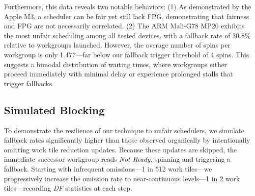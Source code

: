 \documentclass[acmsmall, manuscript, screen, review, anonymous]{acmart}
\begin{document}
Furthermore, this data reveals two notable behaviors: (1) As demonstrated by the Apple M3, a scheduler can be fair yet still lack FPG, demonstrating that fairness and FPG are not necessarily correlated. (2) The ARM Mali-G78 MP20 exhibits the most unfair scheduling among all tested devices, with a fallback rate of 30.8\% relative to workgroups launched. However, the average number of spins per workgroup is only 1.477---far below our fallback trigger threshold of 4 spins. This suggests a bimodal distribution of waiting times, where workgroups either proceed immediately with minimal delay or experience prolonged stalls that trigger fallbacks.

\subsection{Simulated Blocking}%
\label{sec:Sim-Blocking}
To demonstrate the resilience of our technique to unfair schedulers, we simulate fallback rates significantly higher than those observed organically by intentionally omitting work tile reduction updates. Because these updates are skipped, the immediate successor workgroup reads \emph{Not Ready}, spinning and triggering a fallback. Starting with infrequent omissions---1 in 512 work tiles---we progressively increase the omission rate to near-continuous levels---1 in 2 work tiles---recording \emph{DF} statistics at each step.
\end{document}
